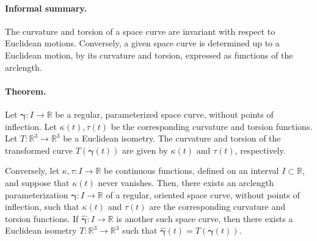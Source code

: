 \documentclass[12pt]{article}
\newcommand{\reals}{\mathbb{R}}
\newcommand{\bg}{\boldsymbol{\gamma}}
\begin{document}
\paragraph{Informal summary.} The curvature and torsion of a space
curve are invariant with respect to Euclidean motions.  Conversely, a
given space curve is determined up to a Euclidean motion, by its
curvature and torsion,  expressed as functions of the arclength.

\paragraph{Theorem.}
Let $\bg:I\to\reals$ be a regular, parameterized space curve, without
points of inflection. Let $\kappa(t), \tau(t)$ be the
corresponding curvature and torsion functions. Let
$T:\reals^3\to\reals^3$ be a Euclidean isometry. The curvature and
torsion of the transformed curve 
$T(\bg(t))$ are given by $\kappa(t)$ and $\tau(t)$, respectively.


Conversely, let $\kappa,\tau:I\to\reals$ be continuous functions,
defined on an interval $I\subset\reals$, and suppose that $\kappa(t)$
never vanishes. Then, there exists an arclength parameterization
$\bg:I\to\reals$ of a regular, oriented space curve, without points of
inflection, such that $\kappa(t)$ and $\tau(t)$ are the corresponding
curvature and torsion functions.  If $\hat{\bg}:I\to\reals$ is another
such space curve, then there exists a Euclidean isometry
$T:\reals^3\to\reals^3$ such that $\hat{\bg}(t) = T(\bg(t)).$
\end{document}

